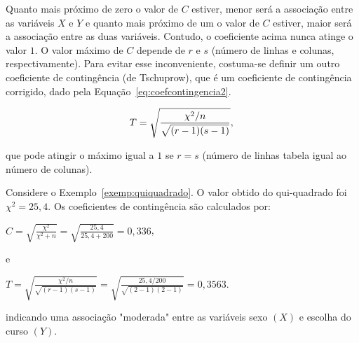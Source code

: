 \documentclass[11pt,fleqn]{book} %
\begin{document}
Quanto mais próximo de zero o valor de $C$ estiver, menor será a associação entre as variáveis $X$ e $Y$ e quanto mais próximo de um o valor de $C$ estiver, maior será a associação entre as duas variáveis. Contudo, o coeficiente acima nunca atinge o valor $1$. O valor máximo de $C$ depende de $r$ e $s$ (número de linhas e colunas, respectivamente). Para evitar esse inconveniente, costuma-se definir um outro coeficiente de contingência (de Tschuprow), que é um coeficiente de contingência corrigido, dado pela Equação~\ref{eq:coefcontingencia2}. \\

\begin{eBox}
\vspace{-0.5cm}
\begin{equation} \label{eq:coefcontingencia2}
\displaystyle T=\sqrt{\frac{\chi^2/n}{\sqrt{(r-1)(s-1)}}}, \\
\end{equation}
\end{eBox}

\vspace{0,2cm}

\noindent que pode atingir o máximo igual a $1$ se $r=s$ (número de linhas tabela igual ao número de colunas).

\vspace{0,3cm}

\begin{example}

Considere o Exemplo~\ref{exemp:quiquadrado}. O valor obtido do qui-quadrado foi $\chi^2=25,4$. Os coeficientes de contingência são calculados por: 

\begin{center}
$\displaystyle C=\sqrt{\frac{\chi^2}{\chi^2+n}}=\sqrt{\frac{25,4}{25,4+200}}=0,336$, \\
\end{center}

e

\begin{center}
$\displaystyle T=\sqrt{\frac{\chi^2/n}{\sqrt{(r-1)(s-1)}}}=\sqrt{\frac{25,4/200}{\sqrt{(2-1)(2-1)}}}=0,3563$. \\
\end{center}

indicando uma associação "moderada" entre as variáveis sexo $(X)$ e escolha do curso $(Y)$. 

\end{example}

\vspace{0,3cm}
\end{document}
